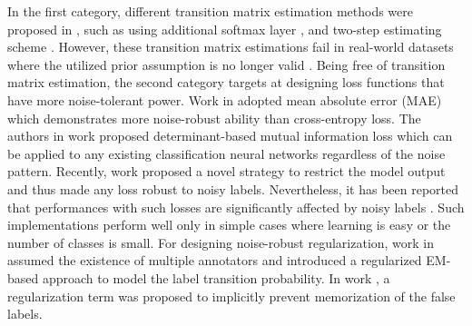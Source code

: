 \documentclass[letterpaper]{article} \usepackage{aaai22}  \usepackage{times}  \usepackage{helvet}  \usepackage{courier}  \usepackage[hyphens]{url}  \usepackage{graphicx} \urlstyle{rm} \def\UrlFont{\rm}  \usepackage{natbib}  \usepackage{caption} \DeclareCaptionStyle{ruled}{labelfont=normalfont,labelsep=colon,strut=off} \frenchspacing  \setlength{\pdfpagewidth}{8.5in}  \setlength{\pdfpageheight}{11in}  \usepackage{algorithm}
\begin{document}
In the first category, different transition matrix estimation methods were proposed in \cite{goldberger2016training,patrini2017making}, such as using additional softmax layer \cite{goldberger2016training}, and two-step estimating scheme \cite{patrini2017making}. However, these transition matrix estimations fail in real-world datasets where the utilized prior assumption is no longer valid \cite{2019Deep}. Being free of transition matrix estimation, the second category targets at designing loss functions that have more noise-tolerant power. Work in \cite{ghosh2017robust} adopted mean absolute error (MAE) which demonstrates more noise-robust ability than cross-entropy loss. The authors in work \cite{xu2019l_dmi} proposed determinant-based mutual information loss which can be applied to any existing classification neural networks regardless of the noise pattern. Recently, work \cite{zhou2021learning} proposed a novel strategy to restrict the model output and thus made any loss robust to noisy labels. Nevertheless, it has been reported that performances with such losses are significantly affected by noisy labels \cite{2018Learning}. Such implementations perform well only in simple cases where learning is easy or the number of classes is small. For designing noise-robust regularization, work in \cite{Tanno2020Learning} assumed the existence of multiple annotators and introduced a regularized EM-based approach to model the label transition probability. In work \cite{2020Early}, a regularization term was proposed to implicitly prevent memorization of the false labels.
\end{document}
